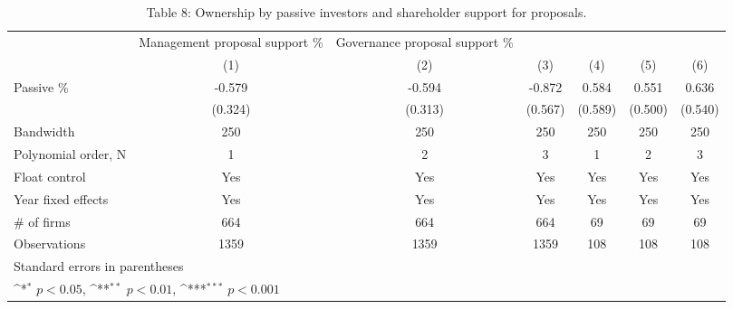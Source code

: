 \begin{table}[htbp]\centering
\def\sym#1{\ifmmode^{#1}\else\(^{#1}\)\fi}
\caption{Table 8: Ownership by passive investors and shareholder support for proposals.}
\begin{tabular}{l*{6}{c}}
\hline\hline
                    &Management proposal support \%         &Governance proposal support \%         &                     &                     &                     &                     \\
                    &\multicolumn{1}{c}{(1)}         &\multicolumn{1}{c}{(2)}         &\multicolumn{1}{c}{(3)}         &\multicolumn{1}{c}{(4)}         &\multicolumn{1}{c}{(5)}         &\multicolumn{1}{c}{(6)}         \\
\hline
Passive \%           &      -0.579         &      -0.594         &      -0.872         &       0.584         &       0.551         &       0.636         \\
                    &     (0.324)         &     (0.313)         &     (0.567)         &     (0.589)         &     (0.500)         &     (0.540)         \\
\hline
Bandwidth           &         250         &         250         &         250         &         250         &         250         &         250         \\
Polynomial order, N &           1         &           2         &           3         &           1         &           2         &           3         \\
Float control       &         Yes         &         Yes         &         Yes         &         Yes         &         Yes         &         Yes         \\
Year fixed effects  &         Yes         &         Yes         &         Yes         &         Yes         &         Yes         &         Yes         \\
\# of firms          &         664         &         664         &         664         &          69         &          69         &          69         \\
Observations        &        1359         &        1359         &        1359         &         108         &         108         &         108         \\
\hline\hline
\multicolumn{7}{l}{\footnotesize Standard errors in parentheses}\\
\multicolumn{7}{l}{\footnotesize \sym{*} \(p<0.05\), \sym{**} \(p<0.01\), \sym{***} \(p<0.001\)}\\
\end{tabular}
\end{table}
